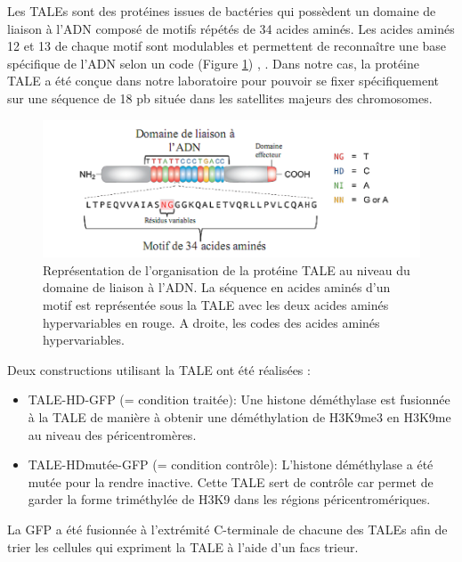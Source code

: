 \documentclass[a4paper,12pt,times]{report}
\newcommand{\scaption}[1]{\caption{\footnotesize{#1}}}
\begin{document}
Les TALEs sont des protéines issues de bactéries qui possèdent un domaine de liaison à l'ADN composé de motifs répétés de 34 acides aminés. Les acides aminés 12 et 13 de chaque motif sont modulables et permettent de reconnaître une base spécifique de l'ADN selon un code (Figure \ref{construction}) \cite{TALE1}, \cite{TALE2}.
Dans notre cas, la protéine TALE a été conçue dans notre laboratoire pour pouvoir se fixer spécifiquement sur une séquence de 18 pb située dans les satellites majeurs des chromosomes.

\begin{figure}[!ht]
\centering
\includegraphics[scale=0.55]{domainTale.png}
\scaption{Représentation de l'organisation de la protéine TALE au niveau du domaine de liaison à l'ADN. La séquence en acides aminés d'un motif est représentée sous la TALE avec les deux acides aminés hypervariables en rouge.
A droite, les codes des acides aminés hypervariables.}
\label{construction}
\end{figure}


Deux constructions utilisant la TALE ont été réalisées : 
\begin{itemize}
 \item TALE-HD-GFP (= condition traitée): Une histone déméthylase est fusionnée à la TALE de manière à obtenir une déméthylation de H3K9me3 en H3K9me  au niveau des péricentromères.
  \item TALE-HDmutée-GFP (= condition contrôle): L'histone déméthylase a été mutée pour la rendre inactive. Cette TALE sert de contrôle car permet de garder la forme triméthylée  de H3K9 dans les régions péricentromériques.
\end{itemize}

La GFP a été fusionnée à l'extrémité C-terminale de chacune des TALEs afin de trier les cellules qui expriment la TALE à l'aide d'un facs trieur. 
 
\end{document}
